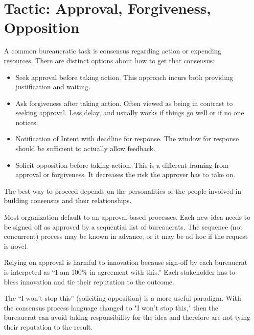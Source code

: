 \section{Tactic: Approval, Forgiveness, Opposition\label{sec:approval-forgiveness-opposition}}

A common bureaucratic task is consensus regarding action or expending resources. There are distinct options about how to get that consensus:
\begin{itemize}
    \item Seek approval before taking action. This approach incurs both providing justification and waiting.
    \item Ask forgiveness after taking action. Often viewed as being in contrast to seeking approval. Less delay, and usually works if things go well or if no one notices. 
    \item Notification of Intent with deadline for response. The window for response should be sufficient to actually allow feedback. 
    \item Solicit opposition before taking action. This is a different framing from approval or forgiveness. It decreases the risk the approver has to take on.
\end{itemize}
The best way to proceed depends on the personalities of the people involved in building consensus and their relationships. 

Most organization default to an approval-based  processes. Each new idea needs to be signed off as approved by a sequential list of bureaucrats. The sequence (not concurrent) process may be known in advance, or it may be ad hoc if the request is novel.

Relying on approval is harmful to innovation because sign-off by each bureaucrat is interpeted as ``I am 100\% in agreement with this.'' Each stakeholder has to bless innovation and tie their reputation to the outcome.

The ``I won't stop this'' (soliciting opposition) is a more useful paradigm. With the consensus process language changed to "I won't stop this," then the bureaucrat can avoid taking responsibility for the idea and therefore are not tying their reputation to the result.

